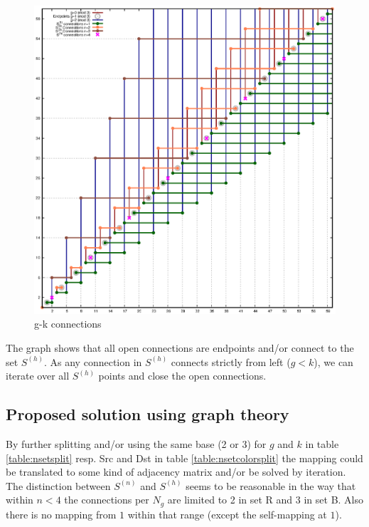 \documentclass[10pt,a4paper]{article}
\begin{document}
\begin{figure}[!htbp]
  \centering
	\includegraphics[width= \textwidth,keepaspectratio]{collatz_S_tree.eps}
	\caption{g-k connections}
\label{fig:S_tree}
\end{figure}

The graph shows that all open connections are endpoints and/or connect to the set $S^{(h)}$. As any connection in $S^{(h)}$ connects strictly from left ($g<k$), we can iterate over all $S^{(h)}$ points and close the open connections.

\subsection{Proposed solution using graph theory}
By further splitting and/or using the same base (2 or 3) for $g$ and $k$ in table \ref{table:nsetsplit} resp. Src and Dst in table \ref{table:nsetcolorsplit} the mapping could be translated to some kind of adjacency matrix and/or be solved by iteration.
The distinction between $S^{(n)}$ and $S^{(h)}$ seems to be reasonable in the way that within $n<4$ the connections per $N_g$ are limited to 2 in set R and 3 in set B. Also there is no mapping from $1$ within that range (except the self-mapping at $1$).
\end{document}
